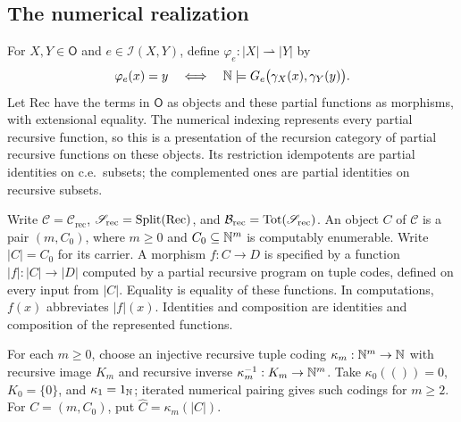 \subsection{The numerical realization}
\label{subsec:numerical-realization}

For $X,Y\in\mathsf O$ and $e\in\mathcal I(X,Y)$, define
$\varphi_e:|X|\rightharpoonup|Y|$ by
\[
 \varphi_e(x)=y\quad\Longleftrightarrow\quad
 \mathbb N\models G_e\bigl(\gamma_X(x),\gamma_Y(y)\bigr).
\]
Let $\mathrm{Rec}$ have the terms in $\mathsf O$ as objects and
these partial functions as morphisms, with extensional equality.
The numerical indexing represents every partial recursive function,
so this is a presentation of the recursion category of partial recursive
functions on these objects.
Its restriction idempotents are partial identities on c.e.\ subsets;
the complemented ones are partial identities on recursive subsets.

Write $\mathcal C=\mathcal C_{\mathrm{rec}}$,
$\mathscr S_{\mathrm{rec}}=\operatorname{Split}(\mathrm{Rec})$, and
$\mathcal B_{\mathrm{rec}}=\operatorname{Tot}(\mathscr S_{\mathrm{rec}})$.
An object $C$ of $\mathcal C$ is a pair $(m,C_0)$, where
$m\ge0$ and $C_0\subseteq\mathbb N^m$ is computably enumerable.
Write $|C|=C_0$ for its carrier. A morphism $f:C\to D$ is
specified by a function $|f|:|C|\to|D|$ computed by a partial
recursive program on tuple codes, defined on every input from
$|C|$. Equality is equality of these functions. In computations,
$f(x)$ abbreviates $|f|(x)$. Identities and composition are
identities and composition of the represented functions.

For each $m\geq0$, choose an injective recursive tuple coding
$\kappa_m:\mathbb N^m\to\mathbb N$ with recursive image $K_m$ and recursive
inverse $\kappa_m^{-1}:K_m\to\mathbb N^m$. Take
$\kappa_0(())=0$, $K_0=\{0\}$, and $\kappa_1=1_{\mathbb N}$;
iterated numerical pairing gives such codings for $m\geq2$.
For $C=(m,C_0)$, put $\widehat C=\kappa_m(|C|)$.


